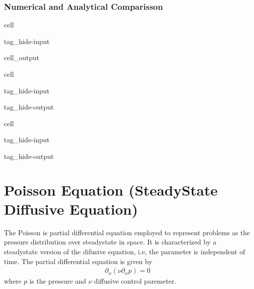 \documentclass[letterpaper,10pt,english,openany,oneside]{jupyterBook}
\begin{document}
\subsection{Numerical and Analytical Comparisson}
\label{\detokenize{LBM-Study/Diffusive-Equation:numerical-and-analytical-comparisson}}
\begin{sphinxuseclass}{cell}
\begin{sphinxuseclass}{tag_hide-input}\begin{sphinxVerbatimOutput}

\begin{sphinxuseclass}{cell_output}
\noindent{}

\end{sphinxuseclass}\end{sphinxVerbatimOutput}

\end{sphinxuseclass}
\end{sphinxuseclass}


\begin{sphinxuseclass}{cell}
\begin{sphinxuseclass}{tag_hide-input}
\begin{sphinxuseclass}{tag_hide-output}
\end{sphinxuseclass}
\end{sphinxuseclass}
\end{sphinxuseclass}


\begin{sphinxuseclass}{cell}
\begin{sphinxuseclass}{tag_hide-input}
\begin{sphinxuseclass}{tag_hide-output}
\end{sphinxuseclass}
\end{sphinxuseclass}
\end{sphinxuseclass}
\sphinxstepscope


\chapter{Poisson Equation (Steady\sphinxhyphen{}State Diffusive Equation)}
\label{\detokenize{LBM-Study/Poisson-Equation:poisson-equation-steady-state-diffusive-equation}}\label{\detokenize{LBM-Study/Poisson-Equation::doc}}
\sphinxAtStartPar
The Poisson is partial differential equation employed to represent problems as the pressure distribution over steady\sphinxhyphen{}state in space. It is characterized by a steady\sphinxhyphen{}state version of the difusive equation, i.e, the parameter is independent of time. The partial differential equation is given by
\begin{equation}\label{equation:LBM-Study/Poisson-Equation:poisson-eq-lb}
\begin{split}
\partial_{\alpha}\left( \nu \partial_{\alpha}p \right) = 0
\end{split}
\end{equation}
\sphinxAtStartPar
where \(p\) is the pressure and \(\nu\) diffusive control paremeter.
\end{document}
